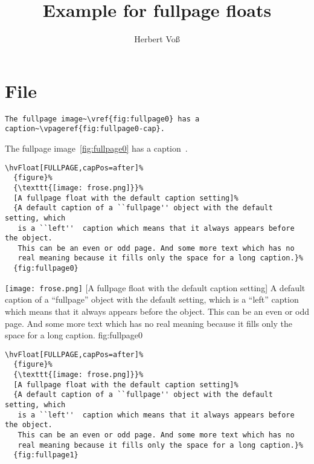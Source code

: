 \documentclass{scrartcl}
\begin{document}
\title{Example for fullpage floats}
\author{Herbert Voß}
\maketitle

\tableofcontents
\blindtext

\blindtext

\section{File \texttt{\jobname}}

\begin{lstlisting}
The fullpage image~\vref{fig:fullpage0} has a caption~\vpageref{fig:fullpage0-cap}.
\end{lstlisting}

The fullpage image~\vref{fig:fullpage0} has a caption~.

\begin{lstlisting}
\hvFloat[FULLPAGE,capPos=after]%
  {figure}%
  {\texttt{[image: frose.png]}}%
  [A fullpage float with the default caption setting]%
  {A default caption of a ``fullpage'' object with the default setting, which
   is a ``left''  caption which means that it always appears before the object.
   This can be an even or odd page. And some more text which has no
   real meaning because it fills only the space for a long caption.}%
  {fig:fullpage0}
\end{lstlisting}


\Float[capPos=after]
%
  {\texttt{[image: frose.png]}}%
  [A fullpage float with the default caption setting]%
  {A default caption of a ``fullpage'' object with the default setting, which
   is a ``left''  caption which means that it always appears before the object.
   This can be an even or odd page. And some more text which has no
   real meaning because it fills only the space for a long caption.}%
  {fig:fullpage0}

\Blindtext

\Blindtext

\begin{lstlisting}
\hvFloat[FULLPAGE,capPos=after]%
  {figure}%
  {\texttt{[image: frose.png]}}%
  [A fullpage float with the default caption setting]%
  {A default caption of a ``fullpage'' object with the default setting, which
   is a ``left''  caption which means that it always appears before the object.
   This can be an even or odd page. And some more text which has no
   real meaning because it fills only the space for a long caption.}%
  {fig:fullpage1}
\end{lstlisting}
\end{document}

